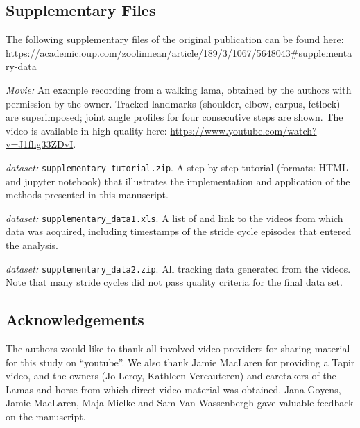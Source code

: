 \FloatBarrier\clearpage

\subsection{Supplementary Files}\label{fcas_supplementary_files}
The following supplementary files of the original publication can be found here:
\\\url{https://academic.oup.com/zoolinnean/article/189/3/1067/5648043#supplementary-data}


\textit{Movie:} {An example recording from a walking lama, obtained by the authors with permission by the owner. Tracked landmarks (shoulder, elbow, carpus, fetlock) are superimposed; joint angle profiles for four consecutive steps are shown. The video is available in high quality here: \url{https://www.youtube.com/watch?v=J1fhg33ZDvI}. }\label{supp:movie1}


\textit{dataset:} \texttt{supplementary\_tutorial.zip}. {A step-by-step tutorial (formats: HTML and jupyter notebook) that illustrates the implementation and application of the methods presented in this manuscript.}\label{supp:tutorial}


\textit{dataset:} \texttt{supplementary\_data1.xls}. {A list of and link to the videos from which data was acquired, including timestamps of the stride cycle episodes that entered the analysis. }\label{supp:data1}


\textit{dataset:} \texttt{supplementary\_data2.zip}. {All tracking data generated from the videos. Note that many stride cycles did not pass quality criteria for the final data set. }\label{supp:data2}






\FloatBarrier\clearpage

\subsection{Acknowledgements}
The authors would like to thank all involved video providers for sharing material for this study on ``youtube''.
We also thank Jamie MacLaren for providing a Tapir video, and the owners (Jo Leroy, Kathleen Vercauteren) and caretakers of the Lamas and horse from which direct video material was obtained. 
Jana Goyens, Jamie MacLaren, Maja Mielke and Sam Van Wassenbergh gave valuable feedback on the manuscript.



% 
% 
